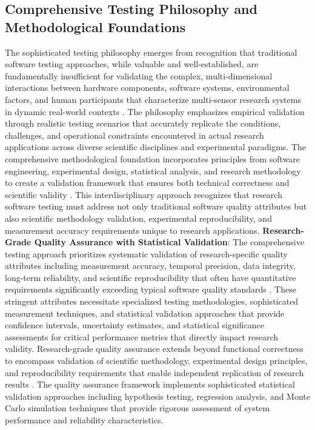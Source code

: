 \documentclass[11pt,a4paper]{report}
\begin{document}
\subsection{Comprehensive Testing Philosophy and Methodological Foundations}
The sophisticated testing philosophy emerges from recognition that traditional software testing approaches, while valuable and well-established, are fundamentally insufficient for validating the complex, multi-dimensional interactions between hardware components, software systems, environmental factors, and human participants that characterize multi-sensor research systems in dynamic real-world contexts \cite{Beizer1990}. The philosophy emphasizes empirical validation through realistic testing scenarios that accurately replicate the conditions, challenges, and operational constraints encountered in actual research applications across diverse scientific disciplines and experimental paradigms.
The comprehensive methodological foundation incorporates principles from software engineering, experimental design, statistical analysis, and research methodology to create a validation framework that ensures both technical correctness and scientific validity \cite{Juristo2001}. This interdisciplinary approach recognizes that research software testing must address not only traditional software quality attributes but also scientific methodology validation, experimental reproducibility, and measurement accuracy requirements unique to research applications.
\textbf{Research-Grade Quality Assurance with Statistical Validation}: The comprehensive testing approach prioritizes systematic validation of research-specific quality attributes including measurement accuracy, temporal precision, data integrity, long-term reliability, and scientific reproducibility that often have quantitative requirements significantly exceeding typical software quality standards \cite{Basili1984}. These stringent attributes necessitate specialized testing methodologies, sophisticated measurement techniques, and statistical validation approaches that provide confidence intervals, uncertainty estimates, and statistical significance assessments for critical performance metrics that directly impact research validity.
Research-grade quality assurance extends beyond functional correctness to encompass validation of scientific methodology, experimental design principles, and reproducibility requirements that enable independent replication of research results \cite{Kitchenham2002}. The quality assurance framework implements sophisticated statistical validation approaches including hypothesis testing, regression analysis, and Monte Carlo simulation techniques that provide rigorous assessment of system performance and reliability characteristics.
\end{document}
